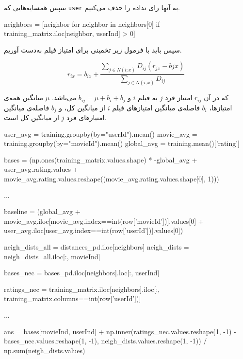 سپس همسایه‌هایی که
\verb;user;
به آنها رای نداده را حذف می‌کنیم.

\begin{latin}
  \begin{python}
neighbors = [neighbor for neighbor in neighbors[0] if
        training_matrix.iloc[neighbor, userInd] > 0]
  \end{python}
\end{latin}

سپس باید با فرمول زیر تخمینی برای امتیاز فیلم به‌دست آوریم.

\begin{latin}
  \begin{equation}
    r_{ix}=b_{ix} + \frac{\sum_{j \in N(i; x)} D_{ij}(r_{jx} - b{jx})}{\sum_{j \in N(i; x)} D_{ij}}
  \end{equation}
\end{latin}

که در آن
$r_{ij}$
امتیاز فرد
$j$
به فیلم
$i$
و
$b_{ij}=\mu + b_{i} + b_{j}$
می‌باشد.
$\mu$
میانگین همه‌ی امتیاز‌ها،
$b_{i}$
فاصله‌ی میانگین امتیاز‌های فیلم
$i$
از میانگین کل، و
$b_{j}$
فاصله‌ی میانگین امتیاز‌های فرد
$j$
از میانگین کل است.

\begin{latin}
  \begin{python}

user_avg = training.groupby(by="userId").mean()
movie_avg = training.groupby(by="movieId").mean()
global_avg = training.mean()['rating']

bases = (np.ones(training_matrix.values.shape) * -global_avg +
        user_avg.rating.values +
        movie_avg.rating.values.reshape((movie_avg.rating.values.shape[0], 1)))

...

baseline = (global_avg +
        movie_avg.iloc[movie_avg.index==int(row['movieId'])].values[0] +
        user_avg.iloc[user_avg.index==int(row['userId'])].values[0])

neigh_dists_all = distances_pd.iloc[neighbors]
neigh_dists = neigh_dists_all.iloc[:, movieInd]


bases_nec = bases_pd.iloc[neighbors].loc[:,
        userInd]

ratings_nec = training_matrix.iloc[neighbors].iloc[:,
        training_matrix.columns==int(row['userId'])]


...


ans = bases[movieInd, userInd] + np.inner(ratings_nec.values.reshape(1, -1) -
        bases_nec.values.reshape(1, -1),
        neigh_dists.values.reshape(1, -1)) / np.sum(neigh_dists.values)


  \end{python}
\end{latin}


